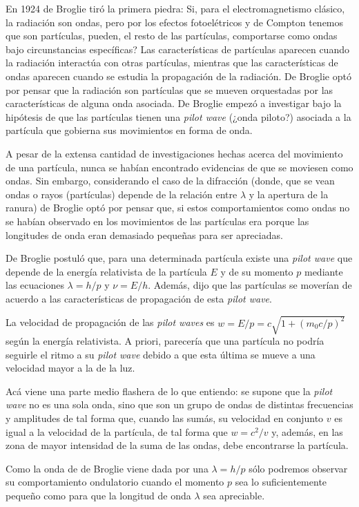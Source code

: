 \documentclass{article}
\begin{document}
En 1924 de Broglie tiró la primera piedra: Si, para el electromagnetismo clásico, la radiación son ondas, pero por los efectos fotoelétricos y de Compton tenemos que son partículas, pueden, el resto de las partículas, comportarse como ondas bajo circunstancias específicas? Las características de partículas aparecen cuando la radiación interactúa con otras partículas, mientras que las características de ondas aparecen cuando se estudia la propagación de la radiación. De Broglie optó por pensar que la radiación son partículas que se mueven orquestadas por las características de alguna onda asociada. De Broglie empezó a investigar bajo la hipótesis de que las partículas tienen una \emph{pilot wave} (¿onda piloto?) asociada a la partícula que gobierna sus movimientos en forma de onda.

A pesar de la extensa cantidad de investigaciones hechas acerca del movimiento de una partícula, nunca se habían encontrado evidencias de que se moviesen como ondas. Sin embargo, considerando el caso de la difracción (donde, que se vean ondas o rayos (partículas) depende de la relación entre $\lambda$ y la apertura de la ranura) de Broglie optó por pensar que, si estos comportamientos como ondas no se habían observado en los movimientos de las partículas era porque las longitudes de onda eran demasiado pequeñas para ser apreciadas.

De Broglie postuló que, para una determinada partícula existe una \emph{pilot wave} que depende de la energía relativista de la partícula $E$ y de su momento $p$ mediante las ecuaciones $\lambda=h/p$ y $\nu=E/h$. Además, dijo que las partículas se moverían de acuerdo a las características de propagación de esta \emph{pilot wave}.

La velocidad de propagación de las \emph{pilot waves} es $w=E/p=c\sqrt{1+(m_{0}c/p)^{2}}$ según la energía relativista. A priori, parecería que una partícula no podría seguirle el ritmo a su \emph{pilot wave} debido a que esta última se mueve a una velocidad mayor a la de la luz.

Acá viene una parte medio flashera de lo que entiendo: se supone que la \emph{pilot wave} no es una sola onda, sino que son un grupo de ondas de distintas frecuencias y amplitudes de tal forma que, cuando las sumás, su velocidad en conjunto $v$ es igual a la velocidad de la partícula, de tal forma que $w=c^{2}/v$ y, además, en las zona de mayor intensidad de la suma de las ondas, debe encontrarse la partícula.

Como la onda de de Broglie viene dada por una $\lambda = h/p$ sólo podremos observar su comportamiento ondulatorio cuando el momento $p$ sea lo suficientemente pequeño como para que la longitud de onda $\lambda$ sea apreciable.
\end{document}
